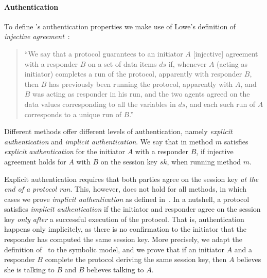 \paragraph{Authentication}
To define \mEdhoc{}'s authentication properties we make use of Lowe's definition
of \emph{injective agreement}~\cite{DBLP:conf/csfw/Lowe97a}:
\begin{quote}
  ``We say that a protocol guarantees to an initiator $A$ [injective] agreement
  with a responder $B$ on a set of data items $ds$ if, whenever $A$ (acting as
  initiator) completes a run of the protocol, apparently with responder $B$,
  then $B$ has previously been running the protocol, apparently with $A$, and
  $B$ was acting as responder in his run, and the two agents agreed on the data
  values corresponding to all the variables in $ds$, and each such run of $A$
  corresponds to a unique run of $B$.''
\end{quote}

Different \mEdhoc{} methods offer different levels of authentication, namely
\emph{explicit authentication} and \emph{implicit authentication}.
We say that \mEdhoc{} in method $m$ satisfies \emph{explicit authentication} for
the initiator $A$ with a responder $B$, if injective agreement holds for $A$
with $B$ on the session key $sk$, when running method $m$.

Explicit authentication requires that both parties agree on the session key
\emph{at the end of a protocol run}.
%
This, however, does not hold for all \mEdhoc{} methods, in which cases we prove
\emph{implicit authentication} as defined
in~\cite{DBLP:journals/iacr/GuilhemFW19}.
%
In a nutshell, a protocol satisfies \emph{implicit authentication} if the
initiator and responder agree on the session key \emph{only after} a successful
execution of the protocol.
%
That is, authentication happens only implicitely, as there is no confirmation to
the initiator that the responder has computed the same session key.
%
More precisely, we adapt the definition of~\cite{DBLP:journals/iacr/GuilhemFW19}
to the symbolic model, and we prove that if an initiator $A$ and a responder $B$
complete the protocol deriving the same session key, then $A$ believes she is
talking to $B$ and $B$ believes  talking to $A$.

